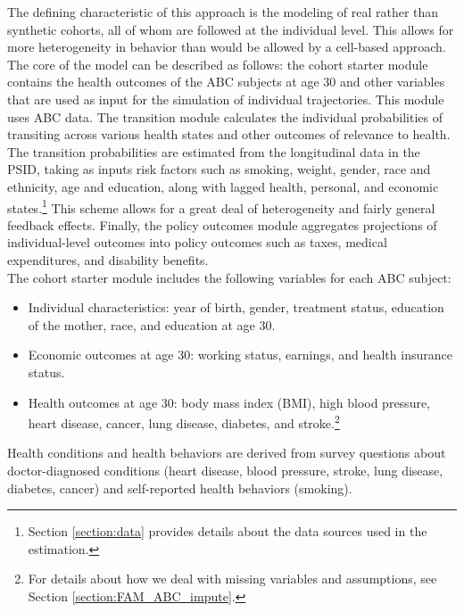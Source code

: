 \noindent The defining characteristic of this approach is the modeling of real rather than synthetic cohorts, all of whom
are followed at the individual level. This allows for more heterogeneity in behavior than would be allowed
by a cell-based approach. The core of the model can be described as follows: the cohort starter module contains the health outcomes of the ABC subjects at age 30 and other variables that are used as input for the simulation of individual trajectories. This module uses ABC data. The transition module calculates the individual probabilities of transiting across various health states and other outcomes of relevance to health. The transition probabilities are estimated from the longitudinal data in the PSID, taking as inputs risk factors such as smoking, weight, gender, race and ethnicity, age and education, along with lagged health, personal, and economic states.\footnote{Section \ref{section:data} provides details about the data sources used in the estimation.} This scheme allows for a great deal of heterogeneity and fairly general feedback effects. Finally, the policy outcomes module aggregates projections of individual-level outcomes into policy outcomes such as
taxes, medical expenditures, and disability benefits. \\


\noindent The cohort starter module includes the following variables for each ABC subject: \\
\begin{itemize}
\item Individual characteristics: year of birth, gender, treatment status, education of the mother, race, and education at age 30.
\item Economic outcomes at age 30: working status, earnings, and health insurance status.
\item Health outcomes at age 30: body mass index (BMI), high blood pressure, heart disease, cancer, lung disease, diabetes, and stroke.\footnote{For details about how we deal with missing variables and assumptions, see Section \ref{section:FAM_ABC_impute}. %
}
\end{itemize}
\noindent Health conditions and health behaviors are derived from survey questions about doctor-diagnosed conditions (heart disease, blood pressure, stroke, lung disease, diabetes, cancer) and self-reported health behaviors (smoking). \\

